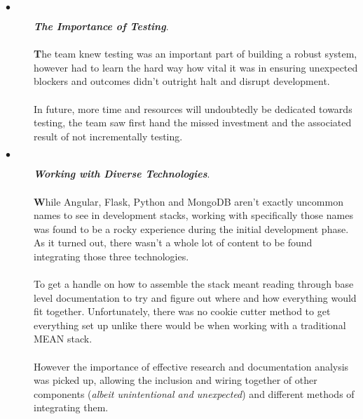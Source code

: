 \begin{description}
  \item[$\bullet$] \textit{\textbf{The Importance of Testing}}.
  
  \paragraph{}
  \textbf{T}he team knew testing was an important part of building a robust system, however had to learn the hard way how vital it was in ensuring unexpected blockers and outcomes didn't outright halt and disrupt development.
  
  \paragraph{}
  In future, more time and resources will undoubtedly be dedicated towards testing, the team saw first hand the missed investment and the associated result of not incrementally testing. \newpage
  
  \item[$\bullet$] \textit{\textbf{Working with Diverse Technologies}}.
  
  \paragraph{}
  \textbf{W}hile Angular, Flask, Python and MongoDB aren't exactly uncommon names to see in development stacks, working with specifically those names was found to be a rocky experience during the initial development phase. As it turned out, there wasn't a whole lot of content to be found integrating those three technologies.
  
  \paragraph{}
  To get a handle on how to assemble the stack meant reading through base level documentation to try and figure out where and how everything would fit together. Unfortunately, there was no cookie cutter method to get everything set up unlike there would be when working with a traditional MEAN stack. 
  
  \paragraph{}
  However the importance of effective research and documentation analysis was picked up, allowing the inclusion and wiring together of other components (\textit{albeit unintentional and unexpected}) and different methods of integrating them.


\end{description}
